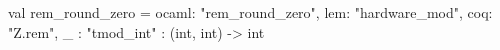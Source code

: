 val rem_round_zero = {ocaml: "rem_round_zero", lem: "hardware_mod", coq: "Z.rem", _ : "tmod_int"} : (int, int) -> int
